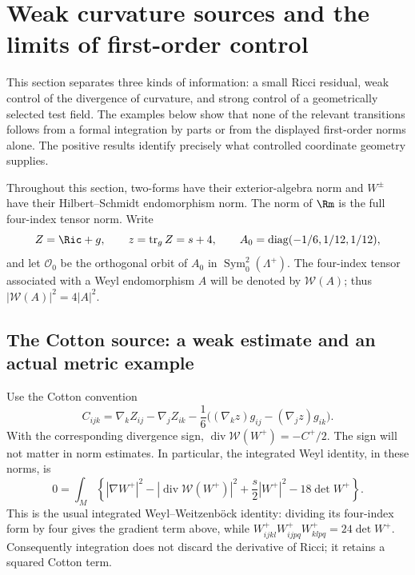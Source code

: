\section{Weak curvature sources and the limits of first-order control}
\label{sec:analytic-limitations}

This section separates three kinds of information: a small Ricci residual,
weak control of the divergence of curvature, and strong control of a
geometrically selected test field.  The examples below show that none of
the relevant transitions follows from a formal integration by parts or
from the displayed first-order norms alone.  The positive results identify
precisely what controlled coordinate geometry supplies.

Throughout this section, two-forms have their exterior-algebra norm and
$W^\pm$ have their Hilbert--Schmidt endomorphism norm.  The norm of $\Rm$
is the full four-index tensor norm.  Write
\[
 Z=\Ric+g,\qquad z=\operatorname{tr}_g Z=s+4,
 \qquad A_0=\operatorname{diag}(-1/6,1/12,1/12),
\]
and let $\mathscr O_0$ be the orthogonal orbit of $A_0$ in
$\operatorname{Sym}^2_0(\Lambda^+)$.  The four-index tensor associated
with a Weyl endomorphism $A$ will be denoted by $\mathcal W(A)$; thus
$|\mathcal W(A)|^2=4|A|^2$.

\subsection{The Cotton source: a weak estimate and an actual metric example}

Use the Cotton convention
\begin{equation}\label{eq:al-cotton}
 C_{ijk}=\nabla_k Z_{ij}-\nabla_j Z_{ik}
 -\frac16\bigl((\nabla_k z)g_{ij}-(\nabla_j z)g_{ik}\bigr).
\end{equation}
With the corresponding divergence sign,
$\operatorname{div}\mathcal W(W^+)=-C^+/2$.  The sign will not matter
in norm estimates.  In particular, the integrated Weyl identity, in these
norms, is
\begin{equation}\label{eq:al-weyl-integral}
 0=\int_M\left\{|\nabla W^+|^2
 -|\operatorname{div}\mathcal W(W^+)|^2
 +\frac{s}{2}|W^+|^2-18\det W^+\right\}.
\end{equation}
This is the usual integrated Weyl--Weitzenb\"ock identity: dividing its
four-index form by four gives the gradient term above, while
$W^+_{ijkl}W^+_{ijpq}W^+_{klpq}=24\det W^+$.  Consequently integration
does not discard the derivative of Ricci; it retains a squared Cotton
term.

